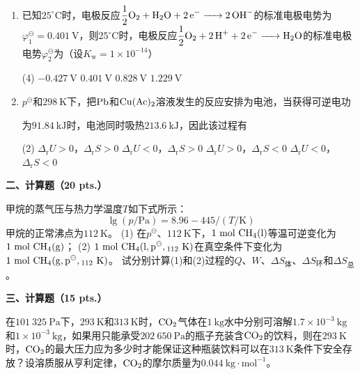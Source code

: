 \begin{enumerate}[label=\arabic*., itemsep=1.5ex]
\begin{tasks}
        \task 高脂肪、高蛋白、高能量饮料
        \task $20\%$葡萄糖水
        \task 含适量维生素的等渗饮料
        \task 含兴奋剂的饮料
    \end{tasks}
    \item 已知$25^\circ\mathrm{C}$时，电极反应$\displaystyle \frac{1}{2}\ce{O_{2} + H_{2}O + 2e^{-} -> 2OH^{-}}$的标准电极电势为$\varphi^\ominus_1=0.401\ \mathrm{V}$，则$25^\circ\mathrm{C}$时，电极反应$\displaystyle \frac{1}{2}\ce{O_{2} + 2H^{+} + 2e^{-} -> H_{2}O}$的标准电极电势$\varphi^\ominus_2$为（设$K_\mathrm{w}=1\times10^{-14}$）
    \begin{tasks}(4)
        \task $-0.427\ \mathrm{V}$
        \task $0.401\ \mathrm{V}$
        \task $0.828\ \mathrm{V}$
        \task $1.229\ \mathrm{V}$
    \end{tasks}
    \item $p^\ominus$和$298\ \mathrm{K}$下，把$\ce{Pb}$和$\ce{Cu(Ac)_{2}}$溶液发生的反应安排为电池，当获得可逆电功
    
    为$91.84\ \mathrm{kJ}$时，电池同时吸热$213.6\ \mathrm{kJ}$，因此该过程有
    \begin{tasks}(2)
        \task $\Delta_\mathrm{r}U>0$，$\Delta_\mathrm{r}S>0$
        \task $\Delta_\mathrm{r}U<0$，$\Delta_\mathrm{r}S>0$
        \task $\Delta_\mathrm{r}U>0$，$\Delta_\mathrm{r}S<0$
        \task $\Delta_\mathrm{r}U<0$，$\Delta_\mathrm{r}S<0$
    \end{tasks}
\end{enumerate}

\vspace{0.5cm}
\noindent\textbf{二、计算题（20 pts.）}

甲烷的蒸气压与热力学温度$T$如下式所示：
\[
\lg(p/\mathrm{Pa}) = 8.96 - 445/(T/\mathrm{K})
\]
甲烷的正常沸点为$112\ \mathrm{K}$。
(1) 在$p^\ominus$、$112\ \mathrm{K}$下，$1\ \mathrm{mol}\ \ce{CH_{4}(l)}$等温可逆变化为$1\ \mathrm{mol}\ \ce{CH_{4}(g)}$；
(2) $1\ \mathrm{mol}\ \ce{CH_{4}(l,p^\ominus,112\ \mathrm{K})}$在真空条件下变化为$1\ \mathrm{mol}\ \ce{CH_{4}(g,p^\ominus,112\ \mathrm{K})}$。
试分别计算(1)和(2)过程的$Q$、$W$、$\Delta S_\text{体}$、$\Delta S_\text{环}$和$\Delta S_\text{总}$。

\vspace{0.5cm}
\noindent\textbf{三、计算题（15 pts.）}

在$101\ 325\ \mathrm{Pa}$下，$293\ \mathrm{K}$和$313\ \mathrm{K}$时，$\ce{CO_{2}}$气体在$1\ \mathrm{kg}$水中分别可溶解$1.7\times10^{-3}\ \mathrm{kg}$和$1\times10^{-3}\ \mathrm{kg}$，如果用只能承受$202\ 650\ \mathrm{Pa}$的瓶子充装含$\ce{CO_{2}}$的饮料，则在$293\ \mathrm{K}$时，$\ce{CO_{2}}$的最大压力应为多少时才能保证这种瓶装饮料可以在$313\ \mathrm{K}$条件下安全存放？设溶质服从亨利定律，$\ce{CO_{2}}$的摩尔质量为$0.044\ \mathrm{kg\cdot mol^{-1}}$。

